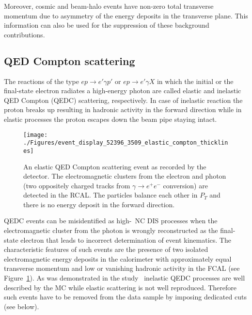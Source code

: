 Moreover, cosmic and beam-halo events have non-zero total transverse momentum due to asymmetry of the energy deposits in the transverse plane. This information can also be used for the suppression of these background contributions. 

\subsection{QED Compton scattering}
The reactions of the type $ep \rightarrow e' \gamma p'$ or $ep \rightarrow e'\gamma X$ in which the initial or the final-state electron radiates a high-energy photon are called elastic and inelastic QED Compton (QEDC) scattering, respectively. In case of inelastic reaction the proton breaks up resulting in hadronic activity in the forward direction while in elastic processes the proton escapes down the beam pipe staying intact. 
\begin{figure}[htbp]
	\centering
	\texttt{[image: ./Figures/event\_display\_52396\_3509\_elastic\_compton\_thicklines]} 
	\caption{An elastic QED Compton scattering event as recorded by the \zeus detector. The electromagnetic clusters from the electron and photon (two oppositely charged tracks from $\gamma \rightarrow e^+e^-$ conversion) are detected in the RCAL. The particles balance each other in $P_T$ and there is no energy deposit in the forward direction.}
	\label{fig:qedceventdisplay}
\end{figure}

QEDC events can be misidentified as high-\qsq~NC DIS processes when the electromagnetic cluster from the photon is wrongly reconstructed as the final-state electron that leads to incorrect determination of event kinematics. The characteristic features of such events are the presence of two isolated electromagnetic energy deposits in the calorimeter with approximately equal transverse momentum and low or vanishing hadronic activity in the FCAL (see Figure~\ref{fig:qedceventdisplay}). As was demonstrated in the study~\cite{thesis:moritz:2001} inelastic QEDC processes are well described by the \djangoh MC while elastic scattering is not well reproduced. Therefore such events have to be removed from the data sample by imposing dedicated cuts (see below).

